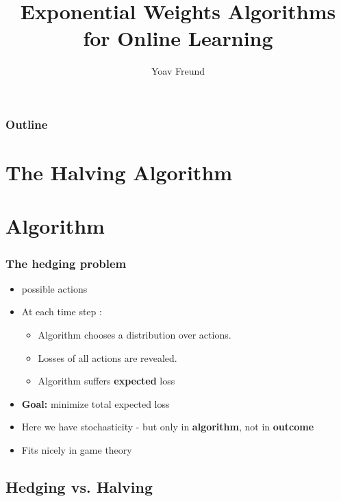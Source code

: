 \documentclass{beamer}
\title[\ouralg] %
{Exponential Weights Algorithms for Online Learning}
\author[Freund] %
{Yoav Freund}
\institute[Universities of Somewhere and Elsewhere] %
\newcommand{\R}[1]{{\color{red}{#1}}}
\begin{document}

\begin{frame}
  \titlepage
\end{frame}

\begin{frame}
  \frametitle{Outline}
  \tableofcontents[pausesections]
\end{frame}

\section{The Halving Algorithm}

\section{\ouralg Algorithm}

\begin{frame}
\frametitle{The hedging problem}

\begin{itemize}
\item \R{$N$} possible actions 

\item At each time step \R{$t=1,2,\ldots,T$}:
\begin{itemize}
\item Algorithm chooses a distribution \R{$\distvec{t}$} over actions.
\item Losses \R{$0 \leq \cost{t}{i} \leq 1$} of all actions \R{$i=1,\ldots,N$} are revealed.
\item Algorithm suffers {\bf expected} loss \R{$\distvec{t} \cdot \costvec{t}$}
\end{itemize}
\item {{\bf Goal:} minimize total expected loss}
\item {Here we have stochasticity - but only in {\bf algorithm}, not in {\bf outcome}}
\item {Fits nicely in game theory}
\end{itemize}
\end{frame}

\subsection{Hedging vs. Halving}
\end{document}
